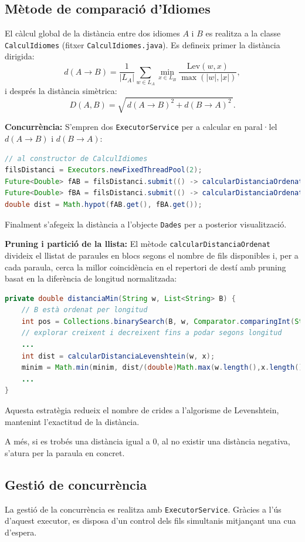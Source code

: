 \documentclass{ieeetj}
\begin{document}
\subsection{Mètode de comparació d'Idiomes}
El càlcul global de la distància entre dos idiomes \(A\) i \(B\) es realitza a la classe \texttt{CalculIdiomes} (fitxer \texttt{CalculIdiomes.java}). Es defineix primer la distància dirigida:
\[
d(A\!\to\!B)
=
\frac{1}{|L_A|}
\sum_{w\in L_A}
\min_{x\in L_B}
\frac{\mathrm{Lev}(w,x)}{\max(|w|,|x|)},
\]
i després la distància simètrica:
\[
D(A,B)
=
\sqrt{\,d(A\!\to\!B)^2 + d(B\!\to\!A)^2\,}.
\]

\medskip
\noindent
\textbf{Concurrència:}  
S’empren dos \texttt{ExecutorService} per a calcular en paral·lel \(d(A\!\to\!B)\) i \(d(B\!\to\!A)\):
\begin{lstlisting}[language=Java]
// al constructor de CalculIdiomes
filsDistanci = Executors.newFixedThreadPool(2);
Future<Double> fAB = filsDistanci.submit(() -> calcularDistanciaOrdenat(A,B,true));
Future<Double> fBA = filsDistanci.submit(() -> calcularDistanciaOrdenat(B,A,false));
double dist = Math.hypot(fAB.get(), fBA.get());
\end{lstlisting}
Finalment s’afegeix la distància a l’objecte \texttt{Dades} per a posterior visualització.

\medskip
\noindent
\textbf{Pruning i partició de la llista:}  
El mètode \texttt{calcularDistanciaOrdenat} divideix el llistat de paraules en blocs segons el nombre de fils disponibles i, per a cada paraula, cerca la millor coincidència en el repertori de destí amb pruning basat en la diferència de longitud normalitzada:
\begin{lstlisting}[language=Java]
private double distanciaMin(String w, List<String> B) {
    // B està ordenat per longitud
    int pos = Collections.binarySearch(B, w, Comparator.comparingInt(String::length));
    // explorar creixent i decreixent fins a podar segons longitud
    ...
    int dist = calcularDistanciaLevenshtein(w, x);
    minim = Math.min(minim, dist/(double)Math.max(w.length(),x.length()));
    ...
}
\end{lstlisting}
Aquesta estratègia redueix el nombre de crides a l’algorisme de Levenshtein, mantenint l’exactitud de la distància.  

A més, si es trobés una distància igual a 0, al no existir una distància negativa, s'atura per la paraula en concret.

\subsection{Gestió de concurrència}
La gestió de la concurrència es realitza amb \texttt{ExecutorService}. Gràcies a l’ús d’aquest executor, es disposa d’un control dels fils simultanis mitjançant una cua d’espera.
\end{document}

